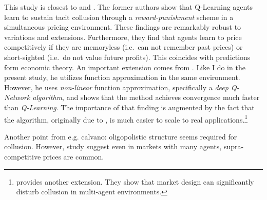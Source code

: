 This study is closest to \textcite{calvano_artificial_2020} and \textcite{hettich_algorithmic_2021}. The former authors show that Q-Learning agents learn to sustain tacit collusion through a \emph{reward-punishment} scheme in a simultaneous pricing environment. These findings are remarkably robust to variations and extensions. Furthermore, they find that agents learn to price competitively if they are memoryless (i.e.\ can not remember past prices) or short-sighted (i.e.\ do not value future profits). This coincides with predictions form economic theory. An important extension comes from \textcite{hettich_algorithmic_2021}. Like I do in the present study, he utilizes function approximation in the same environment. However, he uses \emph{non-linear} function approximation, specifically a \emph{deep Q-Network algorithm}, and shows that the method achieves convergence much faster than \emph{Q-Learning}. The importance of that finding is augmented by the fact that the algorithm, originally due to \textcite{mnih_human-level_2015}, is much easier to scale to real applications.\footnote{\textcite{johnson_platform_2020} provides another extension. They show that market design can significantly disturb collusion in multi-agent environments.}


Another point from e.g. calvano: oligopolistic structure seems required for collusion. However, study suggest even in markets with many agents, supra-competitive prices are common.




